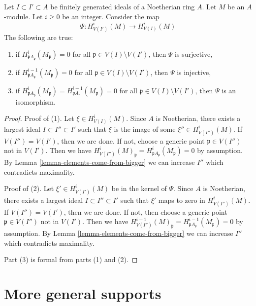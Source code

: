 \begin{lemma}
\label{lemma-isomorphism}
Let $I \subset I' \subset A$ be finitely generated ideals of a
Noetherian ring $A$. Let $M$ be an $A$-module. Let $i \geq 0$ be an integer.
Consider the map
$$
\Psi : H^i_{V(I')}(M) \to H^i_{V(I)}(M)
$$
The following are true:
\begin{enumerate}
\item if $H^i_{\mathfrak pA_\mathfrak p}(M_\mathfrak p) = 0$
for all $\mathfrak p \in V(I) \setminus V(I')$, then
$\Psi$ is surjective,
\item if $H^{i - 1}_{\mathfrak pA_\mathfrak p}(M_\mathfrak p) = 0$
for all $\mathfrak p \in V(I) \setminus V(I')$, then
$\Psi$ is injective,
\item if $H^i_{\mathfrak pA_\mathfrak p}(M_\mathfrak p) =
H^{i - 1}_{\mathfrak pA_\mathfrak p}(M_\mathfrak p) = 0$
for all $\mathfrak p \in V(I) \setminus V(I')$, then
$\Psi$ is an isomorphism.
\end{enumerate}
\end{lemma}

\begin{proof}
Proof of (1).
Let $\xi \in H^i_{V(I)}(M)$. Since $A$ is Noetherian, there exists a
largest ideal $I \subset I'' \subset I'$ such that $\xi$ is the image
of some $\xi'' \in H^i_{V(I'')}(M)$. If $V(I'') = V(I')$, then we are
done. If not, choose a generic point $\mathfrak p \in V(I'')$ not in $V(I')$.
Then we have $H^i_{V(I'')}(M)_\mathfrak p =
H^i_{\mathfrak pA_\mathfrak p}(M_\mathfrak p) = 0$ by assumption.
By Lemma \ref{lemma-elements-come-from-bigger} we can increase $I''$
which contradicts maximality.

\medskip\noindent
Proof of (2). Let $\xi' \in H^i_{V(I')}(M)$ be in the kernel of $\Psi$.
Since $A$ is Noetherian, there exists a
largest ideal $I \subset I'' \subset I'$ such that $\xi'$
maps to zero in $H^i_{V(I'')}(M)$. If $V(I'') = V(I')$, then we are
done. If not, then choose a generic point $\mathfrak p  \in V(I'')$
not in $V(I')$. Then we have $H^{i - 1}_{V(I'')}(M)_\mathfrak p =
H^{i - 1}_{\mathfrak pA_\mathfrak p}(M_\mathfrak p) = 0$ by assumption.
By Lemma \ref{lemma-elements-come-from-bigger} we can increase $I''$
which contradicts maximality.

\medskip\noindent
Part (3) is formal from parts (1) and (2).
\end{proof}





\section{More general supports}
\label{section-supports}

